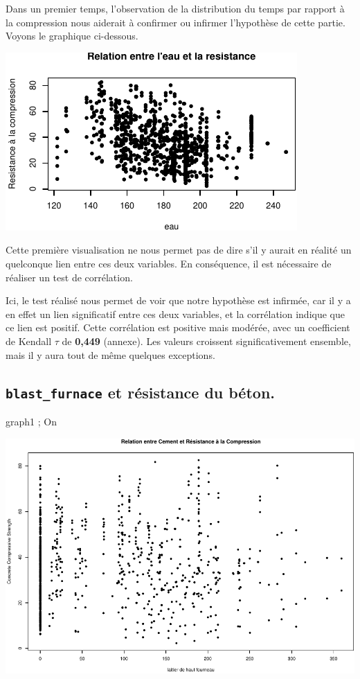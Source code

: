 \documentclass[
  12pt,
]{article}
\begin{document}
Dans un premier temps, l'observation de la distribution du temps par
rapport à la compression nous aiderait à confirmer ou infirmer
l'hypothèse de cette partie. Voyons le graphique ci-dessous.

\begin{center}\includegraphics{rmd_final_files/figure-latex/unnamed-chunk-4-1} \end{center}

Cette première visualisation ne nous permet pas de dire s'il y aurait en
réalité un quelconque lien entre ces deux variables. En conséquence, il
est nécessaire de réaliser un test de corrélation.

Ici, le test réalisé nous permet de voir que notre hypothèse est
infirmée, car il y a en effet un lien significatif entre ces deux
variables, et la corrélation indique que ce lien est positif. Cette
corrélation est positive mais modérée, avec un coefficient de Kendall
\(\tau\) de \textbf{0,449} (annexe). Les valeurs croissent
significativement ensemble, mais il y aura tout de même quelques
exceptions.

\subsection{\texorpdfstring{\texttt{blast\_furnace} et résistance du
béton.}{blast\_furnace et résistance du béton.}}\label{blast_furnace-et-ruxe9sistance-du-buxe9ton.}

graph1 ; On

\begin{center}\includegraphics{rmd_final_files/figure-latex/unnamed-chunk-5-1} \end{center}
\end{document}
